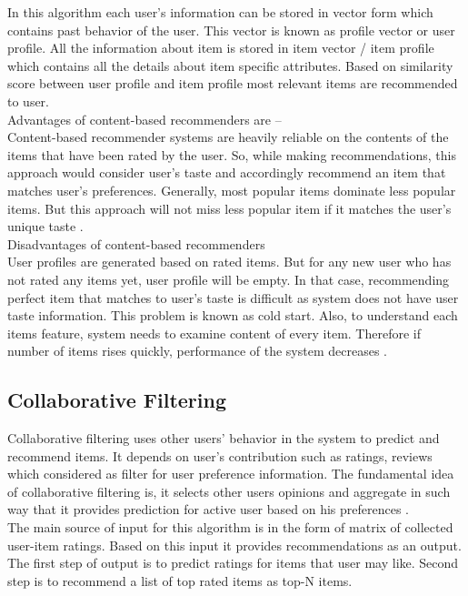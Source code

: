 \noindent In this algorithm each user's information can be stored in vector form which contains past behavior of the user. This vector is known as profile vector or user profile. All the information about item is stored in item vector / item profile which contains all the details about item specific attributes. Based on similarity score between user profile and item profile most relevant items are recommended to user. 
\\
Advantages of content-based recommenders are – 
\\
Content-based recommender systems are heavily reliable on the contents of the items that have been rated by the user. So, while making recommendations, this approach would consider user’s taste and accordingly recommend an item that matches user’s preferences. Generally, most popular items dominate less popular items. But this approach will not miss less popular item if it matches the user’s unique taste \cite{6}.
\\
Disadvantages of content-based recommenders
\\
User profiles are generated based on rated items. But for any new user who has not rated any items yet, user profile will be empty. In that case, recommending perfect item that matches to user’s taste is difficult as system does not have user taste information. This problem is known as cold start. Also, to understand each items feature, system needs to examine content of every item. Therefore if number of items rises quickly, performance of the system decreases \cite{6}.  
\\

\subsection{Collaborative Filtering}
Collaborative filtering uses other users’ behavior in the system to predict and recommend items. It depends on user’s contribution such as ratings, reviews which considered as filter for user preference information. The fundamental idea of collaborative filtering is, it selects other users opinions and aggregate in such way that it provides prediction for active user based on his preferences \cite{7}. 
\\The main source of input for this algorithm is in the form of matrix of collected user-item ratings. Based on this input it provides recommendations as an output. The first step of output is to predict ratings for items that user may like. Second step is to recommend a list of top rated items as top-N items.
\\

